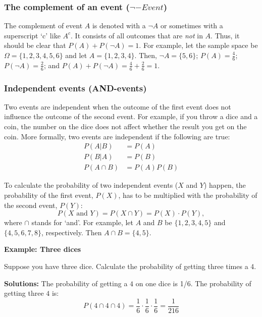 \documentclass[
  12pt,
  oneside]{book}
\theoremstyle{definition}
\theoremstyle{definition}
\theoremstyle{definition}
\theoremstyle{definition}
\theoremstyle{remark}
\begin{document}
\hypertarget{the-complement-of-an-event-neg-event}{%
\subsubsection{\texorpdfstring{The complement of an event (\(\neg-Event\))}{The complement of an event (\textbackslash neg-Event)}}\label{the-complement-of-an-event-neg-event}}

The complement of event \(A\) is denoted with a \(\neg A\) or sometimes with a superscript `c' like \(A^c\).
It consists of all outcomes that are \emph{not} in \(A\). Thus, it should be clear that \(P(A) + P(\neg A) = 1\).
For example, let the sample space be \(\Omega = \{1, 2, 3, 4, 5, 6\}\) and let \(A = \{1, 2, 3, 4\}\).
Then, \(\neg A = \{5, 6\}\); \(P(A) = \frac{4}{6}\); \(P(\neg A) = \frac{2}{6}\); and \(P(A) + P(\neg A) = \frac{4}{6}+\frac{2}{6} = 1\).

\hypertarget{independent-events-and-events}{%
\subsubsection{Independent events (AND-events)}\label{independent-events-and-events}}

Two events are independent when the outcome of the first event does not influence the outcome of the second event.
For example, if you throw a dice and a coin, the number on the dice does not affect whether the result you get on the coin.
More formally, two events are independent if the following are true:
\begin{align*}
    P(A|B) &= P(A)\\
    P(B|A) &= P(B)\\
    P(A \cap B) &= P(A)P(B)
\end{align*}

To calculate the probability of two independent events (\(X\) and \(Y\)) happen, the probability of the first event, \(P(X)\), has to be multiplied with the probability of the second event, \(P(Y)\):
\[ P(X \text{ and } Y)=P(X \cap Y)=P(X)\cdot P(Y),\]
where \(\cap\) stands for `and'.
For example, let \(A\) and \(B\) be \(\{1, 2, 3, 4, 5\}\) and \(\{4, 5, 6, 7, 8\}\), respectively. Then \(A \cap B = \{4, 5\}\).

\textbf{Example: Three dices}

Suppose you have three dice. Calculate the probability of getting three times a 4.

\textbf{Solutions:}
The probability of getting a \(4\) on one dice is 1/6. The probability of getting three \(4\) is:
\[
P(4 \cap 4 \cap 4) = \frac{1}{6}\cdot \frac{1}{6}\cdot \frac{1}{6}= \frac{1}{216}
\]
\end{document}
